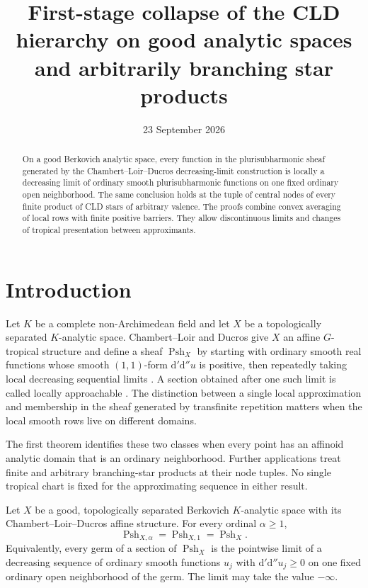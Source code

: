 \documentclass[11pt,a4paper]{amsart}
\title[First-stage CLD collapse]{First-stage collapse of the CLD hierarchy on good analytic spaces and arbitrarily branching star products}
\author{}
\date{23 September 2026}
\begin{document}
\begin{abstract}
On a good Berkovich analytic space, every function in the plurisubharmonic sheaf generated by the Chambert--Loir--Ducros decreasing-limit construction is locally a decreasing limit of ordinary smooth plurisubharmonic functions on one fixed ordinary open neighborhood. The same conclusion holds at the tuple of central nodes of every finite product of CLD stars of arbitrary valence. The proofs combine convex averaging of local rows with finite positive barriers. They allow discontinuous limits and changes of tropical presentation between approximants.
\end{abstract}

\maketitle

\section{Introduction}
\label{sec:introduction}

Let $K$ be a complete non-Archimedean field and let $X$ be a topologically separated $K$-analytic space. Chambert--Loir and Ducros give $X$ an affine $G$-tropical structure and define a sheaf $\operatorname{Psh}_X$ by starting with ordinary smooth real functions whose smooth $(1,1)$-form $\mathrm{d}'\mathrm{d}''u$ is positive, then repeatedly taking local decreasing sequential limits \cite[\S12.4.6, Definition~8.1.1 and Lemma~8.1.4]{CLD12}. A section obtained after one such limit is called locally approachable \cite[Definition~8.1.13]{CLD12}. The distinction between a single local approximation and membership in the sheaf generated by transfinite repetition matters when the local smooth rows live on different domains.

The first theorem identifies these two classes when every point has an affinoid analytic domain that is an ordinary neighborhood. Further applications treat finite and arbitrary branching-star products at their node tuples. No single tropical chart is fixed for the approximating sequence in either result.

\begin{theorem}
\label{thm:analytic-first-stage}
Let $X$ be a good, topologically separated Berkovich $K$-analytic space with its Chambert--Loir--Ducros affine structure. For every ordinal $\alpha\geq1$,
\[
\operatorname{Psh}_{X,\alpha}=\operatorname{Psh}_{X,1}=\operatorname{Psh}_X.
\]
Equivalently, every germ of a section of $\operatorname{Psh}_X$ is the pointwise limit of a decreasing sequence of ordinary smooth functions $u_j$ with $\mathrm{d}'\mathrm{d}''u_j\geq0$ on one fixed ordinary open neighborhood of the germ. The limit may take the value $-\infty$.
\end{theorem}
\end{document}
